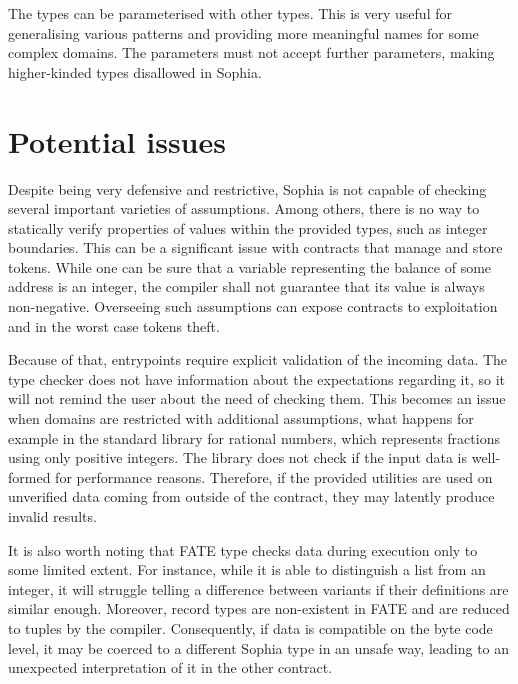 The types can be parameterised with other types. This is very useful for
generalising various patterns and providing more meaningful names for some
complex domains. The parameters must not accept further parameters, making
higher-kinded types disallowed in Sophia.

\section{Potential issues}

Despite being very defensive and restrictive, Sophia is not capable of checking
several important varieties of assumptions. Among others, there is no way to
statically verify properties of values within the provided types, such as
integer boundaries. This can be a significant issue with contracts that manage
and store tokens. While one can be sure that a variable representing the balance
of some address is an integer, the compiler shall not guarantee that its value
is always non-negative. Overseeing such assumptions can expose contracts to
exploitation and in the worst case tokens theft.

Because of that, entrypoints require explicit validation of the incoming data.
The type checker does not have information about the expectations regarding it,
so it will not remind the user about the need of checking them. This becomes an
issue when domains are restricted with additional assumptions, what happens for
example in the standard library for rational numbers, which represents fractions
using only positive integers. The library does not check if the input data is
well-formed for performance reasons. Therefore, if the provided utilities are
used on unverified data coming from outside of the contract, they may latently
produce invalid results.

It is also worth noting that FATE type checks data during execution only to some
limited extent. For instance, while it is able to distinguish a list from an
integer, it will struggle telling a difference between variants if their
definitions are similar enough. Moreover, record types are non-existent in FATE
and are reduced to tuples by the compiler. Consequently, if data is compatible
on the byte code level, it may be coerced to a different Sophia type in an
unsafe way, leading to an unexpected interpretation of it in the other contract.

